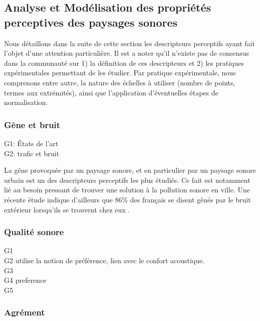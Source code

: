 \subsection{Analyse et Modélisation des propriétés perceptives des paysages sonores}
\label{sec:descripteursPercetifs}

Nous détaillons dans la suite de cette section les descripteurs perceptifs ayant fait l'objet d'une attention particulière. Il est a noter qu'il n'existe pas de consensus dans la communauté sur 1) la définition de ces descripteurs et 2) les pratiques expérimentales permettant de les étudier. Par pratique expérimentale, nous comprenons entre autre, la nature des échelles à utiliser (nombre de points, termes aux extrémités), ainsi que l'application d'éventuelles étapes de normalisation. 

\subsubsection{Gêne et bruit}

G1: \citep{marquis2005noisea,marquis2005noiseb} États de l'art\\
G2: \citep{gille2016testing,gille2016noise,gille2016dose,morel2016noise,trolle2015perception,marquis2015simulated,klein2015spectral} trafic et  bruit 

La gêne provoquée par un paysage sonore, et en particulier par un paysage sonore urbain est un des descripteurs perceptifs les plus étudiés. Ce fait est notamment lié au besoin pressant de trouver une solution à la pollution sonore en ville. Une récente étude indique d'ailleurs que 86\% des français se disent gênés par le bruit extérieur lorsqu'ils se trouvent chez eux \citep{noiseFrench}. \\

\subsubsection{Qualité sonore}

G1 \citep{brocolini2012prediction,ricciardi2015sound} \\
G2 \citep{hong2013designing} utilise la notion de préférence, lien avec le confort acoustique.\\
G3 \citep{ozcevik2012laboratory}\\
G4 \citep{yu2010factors} preference\\
G5 \citep{nilsson2006soundscape,nilsson2007acoustic}

\subsubsection{Agrément}

